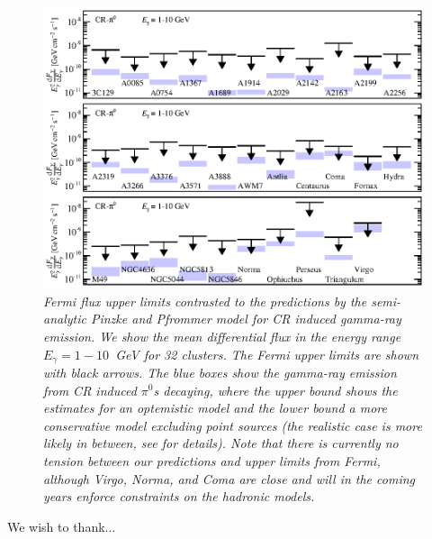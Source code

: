 \documentclass[10pt,aps,pra,reprint,amsmath,amsfonts,amssymb,showpacs]{revtex4-1}
\begin{document}
\begin{figure}
\begin{minipage}{2.0\columnwidth}
  \includegraphics[width=0.99\columnwidth]{figures/Fermi.comp.CR.diff.eps}
  \caption{\it Fermi flux upper limits contrasted to the predictions
    by the semi-analytic Pinzke and Pfrommer model for CR induced
    gamma-ray emission. We show the mean differential flux in the
    energy range $E_\gamma=1-10$~GeV for 32 clusters. The Fermi upper
    limits are shown with black arrows. The blue boxes show the
    gamma-ray emission from CR induced $\pi^0$\:s decaying, where the
    upper bound shows the estimates for an optemistic model and the
    lower bound a more conservative model excluding point sources (the
    realistic case is more likely in between, see
    \cite{2010MNRAS.409..449P} for details). Note that there is
    currently no tension between our predictions and upper limits from
    Fermi, although Virgo, Norma, and Coma are close and will in the
    coming years enforce constraints on the hadronic models.}
 \label{fig15}
\end{minipage}
\end{figure}




\smallskip
We wish to thank...

\vspace{-0.7cm}

%
%

\clearpage
\appendix
\end{document}
